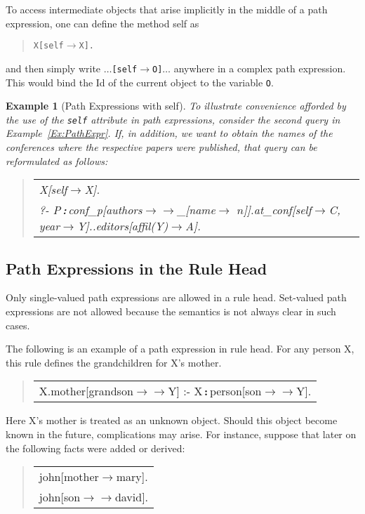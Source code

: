 \documentclass[11pt]{article}
\newtheorem{example}{Example}[section]
\newenvironment{qrules}{\begin{quote}\tt\begin{tabular}[t]{l}}%
{\end{tabular}\end{quote}}
\newcommand{\isa}{\,{\bf{:}}\,}
\newcommand{\fd}{\ensuremath{{\rightarrow}}}                   %
\newcommand{\mvd}{\ensuremath{{\rightarrow\!\!\!\!\rightarrow}}}  %
\newcommand{\anon}{\_}
\begin{document}
To access intermediate objects that arise implicitly in the middle
of a path expression, one can define the method \textsf{self} as
\begin{quote}
  {\tt X[self{\fd}X].} 
\end{quote}
and then simply write $\dots${\tt [self{\fd}O]}$\dots$ anywhere in a
complex path expression. This would bind the Id of the current object to
the variable {\tt O}.

\begin{example}[Path Expressions with \textsf{self}]\label{ex-path-self}
  \rm{
    To illustrate convenience afforded by the use of the {\tt self}
    attribute in path expressions, consider the second query in
    Example~\ref{Ex:PathExpr}. If, in addition, we want to obtain the names
    of the conferences where the respective papers were published, that
    query can be reformulated as follows:
    }
  \begin{qrules}
    X[self\fd X].\\
    ?- P\isa conf\_p[authors\mvd\anon [name\fd
    $n$]].at\_conf[self\fd C, year\fd Y]..editors[affil(Y)\fd A]. 
  \end{qrules}
\end{example}


\subsection{Path Expressions in the Rule Head}\label{sec-pathexp-head}


Only single-valued path expressions are allowed in a rule head. Set-valued
path expressions are not allowed because the semantics is not always clear
in such cases.

The following is an example of a path expression in rule head. For any
person X, this rule defines the grandchildren for X's mother.
\begin{qrules}
X.mother[grandson{\mvd}Y] :- X{\isa}person[son{\mvd}Y].
\end{qrules}
Here X's mother is treated as an unknown object. Should this object become
known in the future, complications may arise. For instance, suppose that
later on the following facts were added or derived:
\begin{qrules}
  john[mother{\fd}mary]. \\
  john[son{\mvd}david].
\end{qrules}
\end{document}

